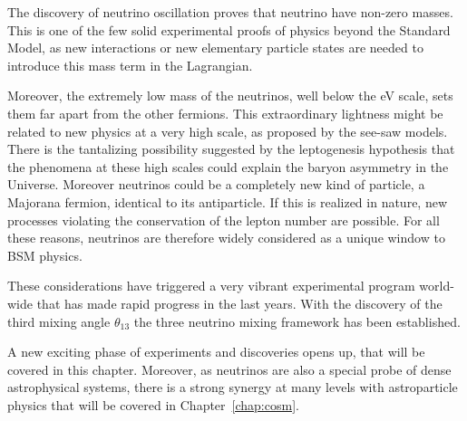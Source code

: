 The discovery of neutrino oscillation proves that neutrino have non-zero masses. This is one of the few solid experimental proofs of physics beyond the Standard Model, as new interactions or new elementary particle states are needed to introduce this mass term in the Lagrangian.

Moreover, the extremely low mass of the neutrinos, well below the eV scale, sets them far apart from the other fermions. This extraordinary lightness might be related to new physics at a very high scale, as proposed by the see-saw models. There is the tantalizing possibility suggested by the leptogenesis hypothesis that the phenomena at these high scales could explain the baryon asymmetry in the Universe. Moreover neutrinos could be a completely new kind of particle, a Majorana fermion, identical to its antiparticle. If this is realized in nature, new processes violating the conservation of the lepton number are possible.
For all these reasons, neutrinos are therefore widely considered as a unique window to BSM physics.

These considerations have triggered a very vibrant experimental program world-wide that has made rapid progress in the last years. With the discovery of the third mixing angle $\theta_{13}$ the three neutrino mixing framework has been established.

A new exciting phase of experiments and discoveries opens up, that will be covered in this chapter. Moreover, as neutrinos are also a special probe of dense astrophysical systems, there is a strong synergy at many levels with astroparticle physics that will be covered in Chapter~\ref{chap:cosm}.


